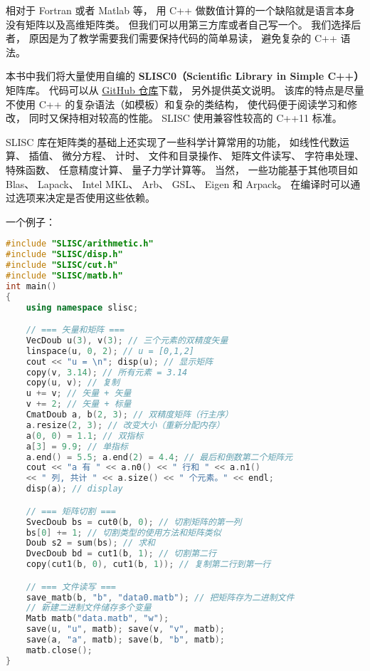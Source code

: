 

相对于 Fortran 或者 Matlab 等， 用 C++ 做数值计算的一个缺陷就是语言本身没有矩阵以及高维矩阵类。 但我们可以用第三方库或者自己写一个。 我们选择后者， 原因是为了教学需要我们需要保持代码的简单易读， 避免复杂的 C++ 语法。

本书中我们将大量使用自编的 \textbf{SLISC0（Scientific Library in Simple C++）} 矩阵库。 代码可以从 \href{https://github.com/MacroUniverse/SLISC0}{GitHub 仓库}下载， 另外提供英文说明。 该库的特点是尽量不使用 C++ 的复杂语法（如模板）和复杂的类结构， 使代码便于阅读学习和修改， 同时又保持相对较高的性能。 SLISC 使用兼容性较高的 C++11 标准。

SLISC 库在矩阵类的基础上还实现了一些科学计算常用的功能， 如线性代数运算、 插值、 微分方程、 计时、 文件和目录操作、 矩阵文件读写、 字符串处理、 特殊函数、 任意精度计算、 量子力学计算等。 当然， 一些功能基于其他项目如 Blas、 Lapack、 Intel MKL、 Arb、 GSL、 Eigen 和 Arpack。 在编译时可以通过选项来决定是否使用这些依赖。

一个例子：
\begin{lstlisting}[language=cpp, caption=intro.cpp]
#include "SLISC/arithmetic.h"
#include "SLISC/disp.h"
#include "SLISC/cut.h"
#include "SLISC/matb.h"
int main()
{
	using namespace slisc;

	// === 矢量和矩阵 ===
	VecDoub u(3), v(3); // 三个元素的双精度矢量
	linspace(u, 0, 2); // u = [0,1,2]
	cout << "u = \n"; disp(u); // 显示矩阵
	copy(v, 3.14); // 所有元素 = 3.14
	copy(u, v); // 复制
	u += v; // 矢量 + 矢量
	v += 2; // 矢量 + 标量
	CmatDoub a, b(2, 3); // 双精度矩阵（行主序）
	a.resize(2, 3); // 改变大小（重新分配内存）
	a(0, 0) = 1.1; // 双指标
	a[3] = 9.9; // 单指标
	a.end() = 5.5; a.end(2) = 4.4; // 最后和倒数第二个矩阵元
	cout << "a 有 " << a.n0() << " 行和 " << a.n1()
	<< " 列, 共计 " << a.size() << " 个元素。" << endl;
	disp(a); // display

	// === 矩阵切割 ===
	SvecDoub bs = cut0(b, 0); // 切割矩阵的第一列
	bs[0] += 1; // 切割类型的使用方法和矩阵类似
	Doub s2 = sum(bs); // 求和
	DvecDoub bd = cut1(b, 1); // 切割第二行
	copy(cut1(b, 0), cut1(b, 1)); // 复制第二行到第一行

	// === 文件读写 ===
	save_matb(b, "b", "data0.matb"); // 把矩阵存为二进制文件
	// 新建二进制文件储存多个变量
	Matb matb("data.matb", "w");
	save(u, "u", matb); save(v, "v", matb);
	save(a, "a", matb); save(b, "b", matb);
	matb.close();
}
\end{lstlisting}

